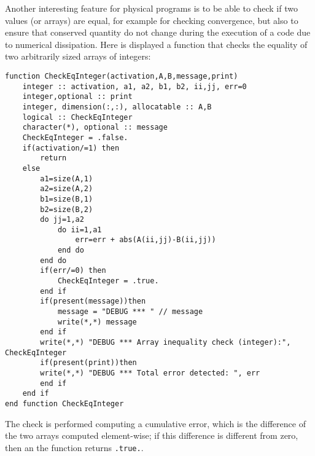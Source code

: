 \documentclass[a4paper]{article}
\begin{document}
Another interesting feature for physical programs is to be able to check if two values (or arrays) are equal, for example for checking convergence, but also to ensure that conserved quantity do not change during the execution of a code due to numerical dissipation.
Here is displayed a function that checks the equality of two arbitrarily sized arrays of integers:


\begin{lstlisting}
function CheckEqInteger(activation,A,B,message,print)
    integer :: activation, a1, a2, b1, b2, ii,jj, err=0
    integer,optional :: print
    integer, dimension(:,:), allocatable :: A,B
    logical :: CheckEqInteger
    character(*), optional :: message
    CheckEqInteger = .false.
    if(activation/=1) then
        return
    else
        a1=size(A,1)
        a2=size(A,2)
        b1=size(B,1)
        b2=size(B,2)
        do jj=1,a2
            do ii=1,a1
                err=err + abs(A(ii,jj)-B(ii,jj))
            end do
        end do
        if(err/=0) then
            CheckEqInteger = .true.
        end if
        if(present(message))then
            message = "DEBUG *** " // message
            write(*,*) message
        end if
        write(*,*) "DEBUG *** Array inequality check (integer):", CheckEqInteger
        if(present(print))then
        write(*,*) "DEBUG *** Total error detected: ", err
        end if
    end if
end function CheckEqInteger
\end{lstlisting}
The check is performed computing a cumulative error, which is the difference of the two arrays computed element-wise; if this difference is different from zero, then an the function returns \lstinline{.true.}.
\end{document}
